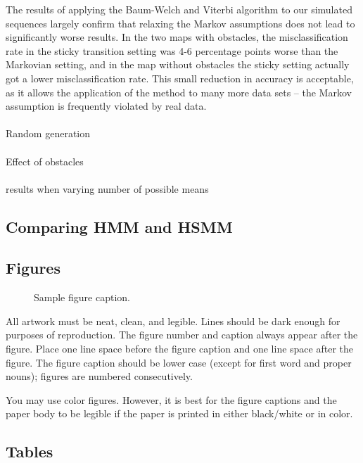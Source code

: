 \documentclass{article}
\begin{document}
The results of applying the Baum-Welch and Viterbi algorithm to our simulated sequences largely confirm that relaxing the Markov assumptions does not lead to significantly worse results. In the two maps with obstacles, the misclassification rate in the sticky transition setting was 4-6 percentage points worse than the Markovian setting, and in the map without obstacles the sticky setting actually got a lower misclassification rate. This small reduction in accuracy is acceptable, as it allows the application of the method to many more data sets -- the Markov assumption is frequently violated by real data.\\
\\
Random generation \\
\\
Effect of obstacles \\
\\
results when varying number of possible means



\subsection{Comparing HMM and HSMM}




\subsection{Figures}

\begin{figure}
  \centering
  \fbox{\rule[-.5cm]{0cm}{4cm} \rule[-.5cm]{4cm}{0cm}}
  \caption{Sample figure caption.}
\end{figure}

All artwork must be neat, clean, and legible. Lines should be dark enough for
purposes of reproduction. The figure number and caption always appear after the
figure. Place one line space before the figure caption and one line space after
the figure. The figure caption should be lower case (except for first word and
proper nouns); figures are numbered consecutively.

You may use color figures.  However, it is best for the figure captions and the
paper body to be legible if the paper is printed in either black/white or in
color.

\subsection{Tables}
\end{document}
